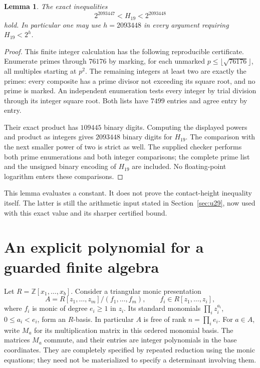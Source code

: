 \documentclass[11pt,a4paper]{article}
\newtheorem{lemma}[theorem]{Lemma}
\theoremstyle{definition}
\theoremstyle{remark}
\begin{document}
\begin{lemma}\label{lem:exact-height-constant}
The exact inequalities
\[
                 2^{2093447}<H_{19}<2^{2093448}
\]
hold. In particular one may use $h=2093448$ in every argument
requiring $H_{19}<2^h$.
\end{lemma}
\begin{proof}
This finite integer calculation has the following reproducible
certificate. Enumerate primes through $76176$ by marking, for
each unmarked $p\le\lfloor\sqrt{76176}\rfloor$, all multiples
starting at $p^2$. The remaining integers at least two are
exactly the primes: every composite has a prime divisor not
exceeding its square root, and no prime is marked.
An independent enumeration tests every integer by trial division
through its integer square root. Both lists have $7499$ entries
and agree entry by entry.

Their exact product has $109445$ binary digits. Computing the
displayed powers and product as integers gives $2093448$ binary
digits for $H_{19}$. The comparison with the next smaller power
of two is strict as well. The supplied checker performs both
prime enumerations and both integer comparisons; the complete
prime list and the unsigned binary encoding of $H_{19}$ are
included. No floating-point logarithm enters these comparisons.
\end{proof}

This lemma evaluates a constant. It does not prove the
contact-height inequality itself. The latter is still the
arithmetic input stated in Section~\ref{sec:u29}, now used with
this exact value and its sharper certified bound.


\section{An explicit polynomial for a guarded finite algebra}
\label{sec:explicit-finite-algebra}

Let $R=\mathbb Z[x_1,\ldots,x_b]$. Consider a triangular monic presentation
\[
 A=R[z_1,\ldots,z_m]/(f_1,\ldots,f_m),\qquad
 f_i\in R[z_1,\ldots,z_i],
\]
where $f_i$ is monic of degree $e_i\ge1$ in $z_i$. Its standard
monomials $\prod_i z_i^{a_i}$, $0\le a_i<e_i$, form an $R$-basis.
In particular $A$ is free of rank $n=\prod_i e_i$. For $a\in A$,
write $M_a$ for its multiplication matrix in this ordered monomial basis.
The matrices $M_a$ commute, and their entries are integer polynomials in
the base coordinates. They are completely specified by repeated reduction
using the monic equations; they need not be materialized to specify a
determinant involving them.
\end{document}
